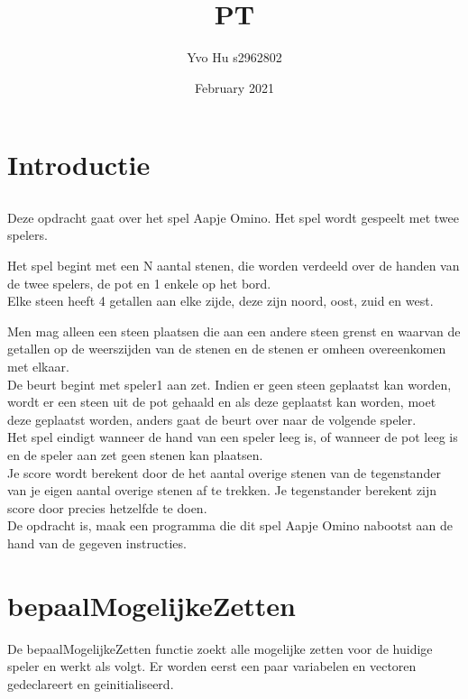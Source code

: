 \documentclass{article}
\title{PT}
\author{Yvo Hu s2962802 }
\date{February 2021}
\begin{document}
\maketitle

\section{Introductie}
\subsection{}
Deze opdracht gaat over het spel Aapje Omino. Het spel wordt gespeelt met twee spelers. 

Het spel begint met een N aantal stenen, die worden verdeeld over de handen van de twee spelers, de pot en 1 enkele op het bord.\\

Elke steen heeft 4 getallen aan elke zijde, deze zijn noord, oost, zuid en west.

Men mag alleen een steen plaatsen die aan een andere steen grenst en waarvan de getallen op de weerszijden van de stenen en de stenen er omheen overeenkomen met elkaar.\\

De beurt begint met speler1 aan zet. Indien er geen steen geplaatst kan worden, wordt er een steen uit de pot gehaald en als deze geplaatst kan worden, moet deze geplaatst worden, anders gaat de beurt over naar de volgende speler.\\

Het spel eindigt wanneer de hand van een speler leeg is, of wanneer de pot leeg is en de speler aan zet geen stenen kan plaatsen.\\

Je score wordt berekent door de het aantal overige stenen van de tegenstander van je eigen aantal overige stenen af te trekken. Je tegenstander berekent zijn score door precies hetzelfde te doen.\\

De opdracht is, maak een programma die dit spel Aapje Omino nabootst aan de hand van de gegeven instructies.\\
\newpage

\section{bepaalMogelijkeZetten}
De bepaalMogelijkeZetten functie zoekt alle mogelijke zetten voor de huidige speler en werkt als volgt.
Er worden eerst een paar variabelen en vectoren gedeclareert en geinitialiseerd. \\
\end{document}
